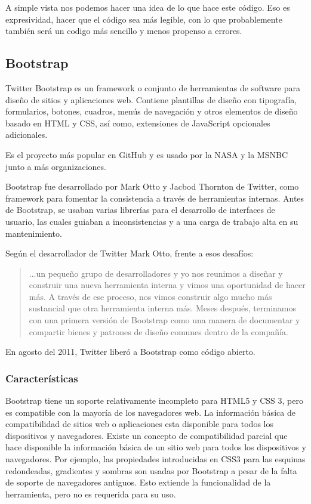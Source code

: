 A simple vista nos podemos  hacer una idea de lo que  hace este código. Eso es expresividad, hacer que el código sea más legible, con lo que probablemente también será  un codigo más sencillo y menos propenso a errores.




\subsection{Bootstrap}

Twitter Bootstrap es un framework o conjunto de herramientas de software para diseño de sitios y aplicaciones web. Contiene plantillas de diseño con tipografía, formularios, botones, cuadros, menús de navegación y otros elementos de diseño basado en HTML y CSS, así como, extensiones de JavaScript opcionales adicionales.

Es el proyecto más popular en GitHub y es usado por la NASA y la MSNBC junto a más organizaciones.

Bootstrap fue desarrollado por Mark Otto y Jacbod Thornton de Twitter, como framework para fomentar la consistencia a través de herramientas internas. Antes de Bootstrap, se usaban varias librerías para el desarrollo de interfaces de usuario, las cuales guiaban a inconsistencias y a una carga de trabajo alta en su mantenimiento. 

Según el desarrollador de Twitter Mark Otto, frente a esos desafíos:
\begin{quotation}
    ...un pequeño grupo de desarrolladores y yo nos reunimos a diseñar y construir una nueva herramienta interna y vimos una oportunidad de hacer más. A través de ese proceso, nos vimos construir algo mucho más sustancial que otra herramienta interna más. Meses después, terminamos con una primera versión de Bootstrap como una manera de documentar y compartir bienes y patrones de diseño comunes dentro de la compañía.
\end{quotation}

En agosto del 2011, Twitter liberó a Bootstrap como código abierto.


\subsubsection{Características}
Bootstrap tiene un soporte relativamente incompleto para HTML5 y CSS 3, pero es compatible con la mayoría de los navegadores web. La información básica de compatibilidad de sitios web o aplicaciones esta disponible para todos los dispositivos y navegadores. Existe un concepto de compatibilidad parcial que hace disponible la información básica de un sitio web para todos los dispositivos y navegadores. Por ejemplo, las propiedades introducidas en CSS3 para las esquinas redondeadas, gradientes y sombras son usadas por Bootstrap a pesar de la falta de soporte de navegadores antiguos. Esto extiende la funcionalidad de la herramienta, pero no es requerida para su uso.

